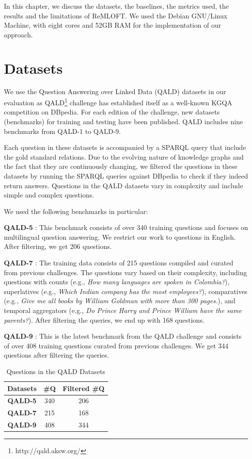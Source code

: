In this chapter, we discuss the datasets, the baselines, the metrics used, the results and the limitations of ReMLOFT. We used the Debian GNU/Linux Machine, with eight cores and 52GB RAM for the implementation of our approach.

\section{Datasets}
We use the Question Answering over Linked Data (QALD) datasets in our evaluation as QALD\footnote{http://qald.aksw.org/} challenge has established itself as a well-known KGQA competition on DBpedia. For each edition of the challenge, new datasets (benchmarks) for training and testing have been published. QALD includes nine benchmarks from QALD-1 to QALD-9. 

Each question in these datasets is accompanied by a SPARQL query that include the gold standard relations. Due to the evolving nature of knowledge graphs and the fact that they are continuously changing, we filtered the questions in these datasets by running the SPARQL queries against DBpedia to check if they indeed return answers. Questions in the QALD datasets vary in complexity and include simple and complex questions. 

We used the following benchmarks in particular: 

\textbf{QALD-5}  \cite{qald5}: This benchmark consists of over 340 training questions and focuses on multilingual question answering. We restrict our work to questions in English. After filtering, we get 206 questions.

\textbf{QALD-7} \cite{qald7}: The training data consists of 215 questions compiled and curated from previous challenges. The questions vary based on their complexity, including questions with counts (e.g., \textit{How many languages are spoken in Colombia?}), superlatives (e.g., \textit{Which Indian company has the most employees?}), comparatives (e.g., \textit{Give me all books by William Goldman with more than 300 pages.}), and temporal aggregators (e.g., \textit{Do Prince Harry and Prince William have the same parents?}). After filtering the queries, we end up with 168 questions.

\textbf{QALD-9} \cite{qald9}: This is the latest benchmark from the QALD challenge and consists of over 408 training questions curated from previous challenges. We get 344 questions after filtering the queries.

\begin{table}[H]
    \centering
    \begin{tabular}{|c|c|c|}
     \hline
    \textbf{Datasets} & \textbf{\#Q} & \textbf{Filtered \#Q} \\ [0.3ex] \hline
    \textbf{ QALD-5} & 340 & 206 \\ 
     \hline
    \textbf{ QALD-7} & 215 & 168 \\
     \hline
    \textbf{ QALD-9} & 408  & 344 \\
     \hline
    \end{tabular}
    \caption{Questions in the QALD Datasets}
    \label{tab:QALDdatasets}
\end{table}

